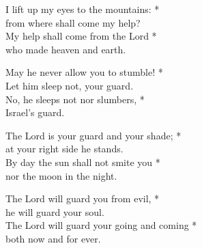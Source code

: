 I lift up my eyes to the mountains: *\\
from where shall come my help?\\
My help shall come from the Lord *\\
who made heaven and earth.

May he never allow you to stumble! *\\
Let him sleep not, your guard.\\
No, he sleeps not nor slumbers, *\\
Israel's guard.

The Lord is your guard and your shade; *\\
at your right side he stands.\\
By day the sun shall not smite you *\\
nor the moon in the night.

The Lord will guard you from evil, *\\
he will guard your soul.\\
The Lord will guard your going and coming *\\
both now and for ever.